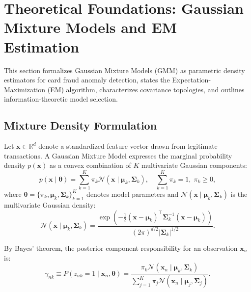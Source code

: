\section{Theoretical Foundations: Gaussian Mixture Models and EM Estimation}
\label{sec:gmm_theory}

This section formalizes Gaussian Mixture Models (GMM) as parametric density estimators for card fraud anomaly detection, states the Expectation-Maximization (EM) algorithm, characterizes covariance topologies, and outlines information-theoretic model selection.

\subsection{Mixture Density Formulation}
Let $\mathbf{x} \in \mathbb{R}^d$ denote a standardized feature vector drawn from legitimate transactions. A Gaussian Mixture Model expresses the marginal probability density $p(\mathbf{x})$ as a convex combination of $K$ multivariate Gaussian components:
\begin{equation}
p(\mathbf{x} \mid \boldsymbol{\theta}) = \sum_{k=1}^K \pi_k \mathcal{N}(\mathbf{x} \mid \boldsymbol{\mu}_k, \boldsymbol{\Sigma}_k), \quad \sum_{k=1}^K \pi_k = 1, \; \pi_k \ge 0,
\label{eq:gmm_marginal}
\end{equation}
where $\boldsymbol{\theta} = \{\pi_k, \boldsymbol{\mu}_k, \boldsymbol{\Sigma}_k\}_{k=1}^K$ denotes model parameters and $\mathcal{N}(\mathbf{x} \mid \boldsymbol{\mu}_k, \boldsymbol{\Sigma}_k)$ is the multivariate Gaussian density:
\begin{equation}
\mathcal{N}(\mathbf{x} \mid \boldsymbol{\mu}_k, \boldsymbol{\Sigma}_k) = \frac{\exp\left( -\frac{1}{2} (\mathbf{x} - \boldsymbol{\mu}_k)^\top \boldsymbol{\Sigma}_k^{-1} (\mathbf{x} - \boldsymbol{\mu}_k) \right)}{(2\pi)^{d/2} |\boldsymbol{\Sigma}_k|^{1/2}}.
\label{eq:gaussian_density}
\end{equation}

By Bayes' theorem, the posterior component responsibility for an observation $\mathbf{x}_n$ is:
\begin{equation}
\gamma_{nk} \equiv P(z_{nk} = 1 \mid \mathbf{x}_n, \boldsymbol{\theta}) = \frac{\pi_k \mathcal{N}(\mathbf{x}_n \mid \boldsymbol{\mu}_k, \boldsymbol{\Sigma}_k)}{\sum_{j=1}^K \pi_j \mathcal{N}(\mathbf{x}_n \mid \boldsymbol{\mu}_j, \boldsymbol{\Sigma}_j)}.
\label{eq:responsibility}
\end{equation}

